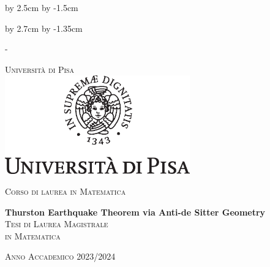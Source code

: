\advance\vsize by 2.5cm %
\advance\voffset by -1.5cm %


\begin{titlingpage}


\advance\hsize by 2.7cm %
\advance\hoffset by -1.35cm %




\calccentering{\unitlength}
\begin{adjustwidth*}{\unitlength}{-\unitlength}


\thispagestyle{empty}
\begin{center}
\large
\textsc{\Large Università di Pisa\\}
\vspace{0.6cm}
\includegraphics[width=8cm]{cherubino.eps}

\vspace{0.8cm}
\textsc{\Large{Corso di laurea in Matematica}}\\



\vspace{2.5cm}


{\LARGE\textbf{Thurston Earthquake Theorem via Anti-de Sitter Geometry}}
\\[2.0cm]

\textsc{Tesi di Laurea Magistrale \\[0.2cm] in Matematica}\\
\vspace{0.5cm}

\begin{center}

\textsc{\Large Anno Accademico 2023/2024}
\end{center}

\vspace{0.2cm}

%
%


\end{center}
\end{adjustwidth*}
\end{titlingpage}
